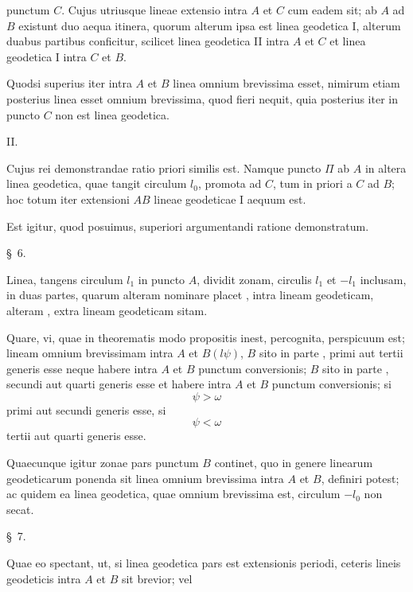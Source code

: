 \begingroup\small
punctum $C$. Cujus utriusque lineae extensio intra $A$ et $C$ cum eadem sit; ab $A$ ad $B$ existunt duo aequa itinera, quorum alterum ipsa est linea geodetica I, alterum duabus partibus conficitur, scilicet linea geodetica II intra $A$ et $C$ et linea geodetica I intra $C$ et $B$.

Quodsi superius iter intra $A$ et $B$ linea omnium brevissima esset, nimirum etiam posterius linea esset omnium brevissima, quod fieri nequit, quia posterius iter in puncto $C$ non est linea geodetica.

II. 

Cujus rei demonstrandae ratio priori similis est.
Namque puncto $\Pi$ ab $A$ in altera linea geodetica, quae tangit circulum $l_0$, promota ad $C$, tum in priori a $C$ ad $B$; hoc totum iter extensioni $AB$ lineae geodeticae I aequum est.

Est igitur, quod posuimus, superiori argumentandi ratione demonstratum.

\begin{center}\S\ 6.\end{center}

Linea, tangens circulum $l_1$ in puncto $A$, dividit zonam, circulis $l_1$ et $-l_1$ inclusam, in duas partes, quarum alteram nominare placet , intra lineam geodeticam, alteram , extra lineam geodeticam sitam.

Quare, vi, quae in theorematis modo propositis inest, percognita, perspicuum est; lineam omnium brevissimam intra $A$ et $B(l\psi)$, $B$ sito in parte , primi aut tertii generis esse neque habere intra $A$ et $B$ punctum conversionis; $B$ sito in parte , secundi aut quarti generis esse et habere intra $A$ et $B$ punctum conversionis; si
\[
 \psi>\omega
\]
primi aut secundi generis esse, si
\[
 \psi<\omega
\]
tertii aut quarti generis esse.

Quaecunque igitur zonae pars punctum $B$ continet, quo in genere linearum geodeticarum ponenda sit linea omnium brevissima intra $A$ et $B$, definiri potest; ac quidem ea linea geodetica, quae omnium brevissima est, circulum $-l_0$ non secat.

\begin{center}\S\ 7.\end{center}

Quae eo spectant, ut, si linea geodetica pars est extensionis periodi, ceteris lineis geodeticis intra $A$ et $B$ sit brevior;
vel 
\endgroup
